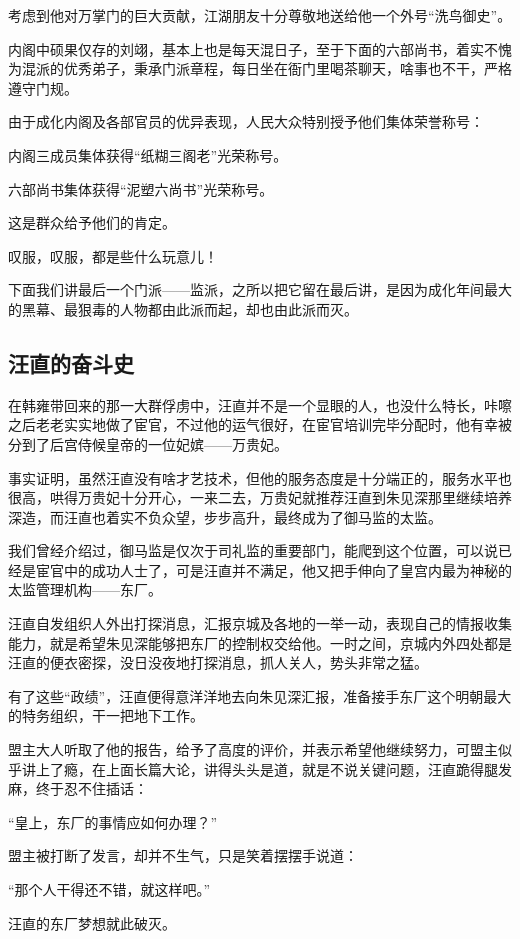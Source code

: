 \begin{multicols}{\theparacolNo}
考虑到他对万掌门的巨大贡献，江湖朋友十分尊敬地送给他一个外号“洗鸟御史”。

内阁中硕果仅存的刘翊，基本上也是每天混日子，至于下面的六部尚书，着实不愧为混派的优秀弟子，秉承门派章程，每日坐在衙门里喝茶聊天，啥事也不干，严格遵守门规。

由于成化内阁及各部官员的优异表现，人民大众特别授予他们集体荣誉称号：

内阁三成员集体获得“纸糊三阁老”光荣称号。

六部尚书集体获得“泥塑六尚书”光荣称号。

这是群众给予他们的肯定。

叹服，叹服，都是些什么玩意儿！

下面我们讲最后一个门派——监派，之所以把它留在最后讲，是因为成化年间最大的黑幕、最狠毒的人物都由此派而起，却也由此派而灭。

\subsection{汪直的奋斗史}
在韩雍带回来的那一大群俘虏中，汪直并不是一个显眼的人，也没什么特长，咔嚓之后老老实实地做了宦官，不过他的运气很好，在宦官培训完毕分配时，他有幸被分到了后宫侍候皇帝的一位妃嫔——万贵妃。

事实证明，虽然汪直没有啥才艺技术，但他的服务态度是十分端正的，服务水平也很高，哄得万贵妃十分开心，一来二去，万贵妃就推荐汪直到朱见深那里继续培养深造，而汪直也着实不负众望，步步高升，最终成为了御马监的太监。

我们曾经介绍过，御马监是仅次于司礼监的重要部门，能爬到这个位置，可以说已经是宦官中的成功人士了，可是汪直并不满足，他又把手伸向了皇宫内最为神秘的太监管理机构——东厂。

汪直自发组织人外出打探消息，汇报京城及各地的一举一动，表现自己的情报收集能力，就是希望朱见深能够把东厂的控制权交给他。一时之间，京城内外四处都是汪直的便衣密探，没日没夜地打探消息，抓人关人，势头非常之猛。

有了这些“政绩”，汪直便得意洋洋地去向朱见深汇报，准备接手东厂这个明朝最大的特务组织，干一把地下工作。

盟主大人听取了他的报告，给予了高度的评价，并表示希望他继续努力，可盟主似乎讲上了瘾，在上面长篇大论，讲得头头是道，就是不说关键问题，汪直跪得腿发麻，终于忍不住插话：

“皇上，东厂的事情应如何办理？”

盟主被打断了发言，却并不生气，只是笑着摆摆手说道：

“那个人干得还不错，就这样吧。”

汪直的东厂梦想就此破灭。


\end{multicols}
